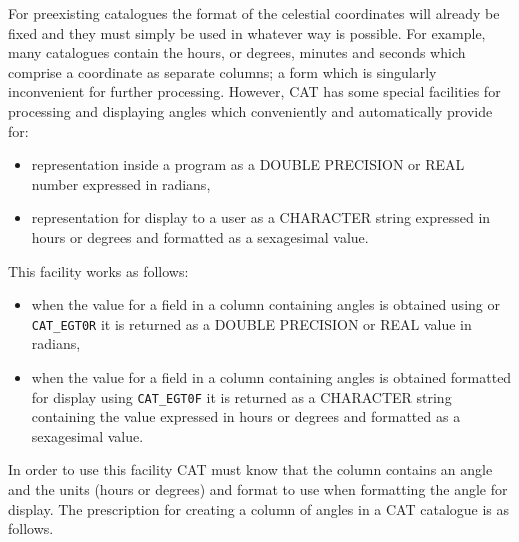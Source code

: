 For preexisting catalogues the format of the celestial 
coordinates will already be fixed and they must simply be used 
in whatever way is possible. For example, many catalogues 
contain the hours, or degrees, minutes and seconds which 
comprise a coordinate as separate columns; a form which is 
singularly inconvenient for further processing. However, CAT has 
some special facilities for processing and displaying angles 
which conveniently and automatically provide for:

\begin{itemize}

  \item representation inside a program as a DOUBLE PRECISION or 
   REAL number expressed in radians,

  \item representation for display to a user as a CHARACTER 
   string expressed in hours or degrees and formatted as a 
   sexagesimal value.

\end{itemize}

This facility works as follows:

\begin{itemize}

  \item when the value for a field in a column containing angles 
   is obtained using 
   or {\tt CAT\_EGT0R} it is returned as a 
   DOUBLE PRECISION or REAL value in radians,

  \item when the value for a field in a column containing angles 
   is obtained formatted for display using {\tt CAT\_EGT0F} it is 
   returned as a CHARACTER string containing the value expressed in 
   hours or degrees and formatted as a sexagesimal value.

\end{itemize}

In order to use this facility CAT must know that the column 
contains an angle and the units (hours or degrees) and format to 
use when formatting the angle for display. The prescription for 
creating a column of angles in a CAT catalogue is as follows.

